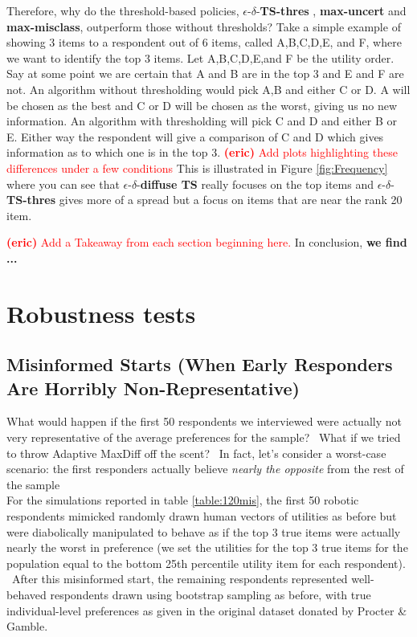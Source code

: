 \documentclass[nonblindrev]{informs3}
\newcommand{\eric}[1]{\textcolor{red}{\textbf{(eric)} #1}}
\newcommand{\mismin}{\textbf{max-misclass}}
\newcommand{\edts}{$\epsilon$-$\delta$-\textbf{diffuse TS} }
\newcommand{\edtsthres}{$\epsilon$-$\delta$-\textbf{TS-thres} }
\newcommand{\uncert}{\textbf{max-uncert} }
\begin{document}
Therefore, why do the threshold-based policies, \edtsthres, \uncert and \mismin, outperform those without thresholds? Take a simple example of showing 3 items to a respondent out of 6 items, called A,B,C,D,E, and F, where we want to identify the top 3 items. Let A,B,C,D,E,and F be the utility order. Say at some point we are certain that A and B are in the top 3 and E and F are not. An algorithm without thresholding would pick A,B and either C or D. A will be chosen as the best and C or D will be chosen as the worst, giving us no new information. An algorithm with thresholding will pick C and D and either B or E. Either way the respondent will give a comparison of C and D which gives information as to which one is in the top 3. \eric{Add plots highlighting these differences under a few conditions} This is illustrated in Figure \ref{fig:Frequency} where you can see that \edts really focuses on the top items and \edtsthres gives more of a spread but a focus on items that are near the rank 20 item.



\eric{Add a Takeaway from each section beginning here.} In conclusion, \textbf{we find ... }


\section{Robustness tests} \label{sec:robust}

\subsection{Misinformed Starts (When Early Responders Are Horribly Non-Representative)}

What would happen if the first 50 respondents we interviewed were actually not very representative of the average preferences for the sample?  What if we tried to throw Adaptive MaxDiff off the scent?  In fact, let's consider a worst-case scenario: the first responders actually believe \textit{nearly the opposite} from the rest of the sample\\
For the simulations reported in table \ref{table:120mis}, the first 50 robotic respondents mimicked randomly drawn human vectors of utilities as before but were diabolically manipulated to behave as if the top 3 true items were actually nearly the worst in preference (we set the utilities for the top 3 true items for the population equal to the bottom 25th percentile utility item for each respondent).  After this misinformed start, the remaining respondents represented well-behaved respondents drawn using bootstrap sampling as before, with true individual-level preferences as given in the original dataset donated by Procter \& Gamble.\\
\end{document}
